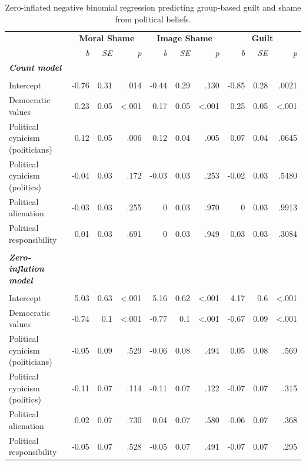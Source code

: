 \documentclass[
]{article}
\begin{document}
\begin{table}[H]
\centering
\caption{\label{tab:TableS2}Zero-inflated negative binomial regression predicting group-based guilt and shame from political beliefs.}
\centering
\fontsize{8}{10}\selectfont
\begin{tabular}[t]{lrrrrrrrrr}
\toprule
\multicolumn{1}{c}{\textbf{}} & \multicolumn{3}{c}{\textbf{Moral Shame}} & \multicolumn{3}{c}{\textbf{Image Shame}} & \multicolumn{3}{c}{\textbf{Guilt}} \\
\cmidrule(l{3pt}r{3pt}){2-4} \cmidrule(l{3pt}r{3pt}){5-7} \cmidrule(l{3pt}r{3pt}){8-10}
\em{ } & \em{b} & \em{SE} & \em{p} & \em{b} & \em{SE} & \em{p} & \em{b} & \em{SE} & \em{p}\\
\midrule
\em{\textbf{Count model}} & \em{\textbf{}} & \em{\textbf{}} & \em{\textbf{}} & \em{\textbf{}} & \em{\textbf{}} & \em{\textbf{}} & \em{\textbf{}} & \em{\textbf{}} & \em{\textbf{}}\\
\midrule\\
Intercept & -0.76 & 0.31 & .014 & -0.44 & 0.29 & .130 & -0.85 & 0.28 & .0021\\
Democratic values & 0.23 & 0.05 & <.001 & 0.17 & 0.05 & <.001 & 0.25 & 0.05 & <.001\\
Political cynicism (politicians) & 0.12 & 0.05 & .006 & 0.12 & 0.04 & .005 & 0.07 & 0.04 & .0645\\
Political cynicism (politics) & -0.04 & 0.03 & .172 & -0.03 & 0.03 & .253 & -0.02 & 0.03 & .5480\\
\addlinespace
Political alienation & -0.03 & 0.03 & .255 & 0 & 0.03 & .970 & 0 & 0.03 & .9913\\
Political responsibility & 0.01 & 0.03 & .691 & 0 & 0.03 & .949 & 0.03 & 0.03 & .3084\\
\midrule\\
\em{\textbf{Zero-inflation model}} & \em{\textbf{}} & \em{\textbf{}} & \em{\textbf{}} & \em{\textbf{}} & \em{\textbf{}} & \em{\textbf{}} & \em{\textbf{}} & \em{\textbf{}} & \em{\textbf{}}\\
\midrule\\
Intercept & 5.03 & 0.63 & <.001 & 5.16 & 0.62 & <.001 & 4.17 & 0.6 & <.001\\
Democratic values & -0.74 & 0.1 & <.001 & -0.77 & 0.1 & <.001 & -0.67 & 0.09 & <.001\\
\addlinespace
Political cynicism (politicians) & -0.05 & 0.09 & .529 & -0.06 & 0.08 & .494 & 0.05 & 0.08 & .569\\
Political cynicism (politics) & -0.11 & 0.07 & .114 & -0.11 & 0.07 & .122 & -0.07 & 0.07 & .315\\
Political alienation & 0.02 & 0.07 & .730 & 0.04 & 0.07 & .580 & -0.06 & 0.07 & .368\\
Political responsibility & -0.05 & 0.07 & .528 & -0.05 & 0.07 & .491 & -0.07 & 0.07 & .295\\
\bottomrule
\end{tabular}
\end{table}
\end{document}
